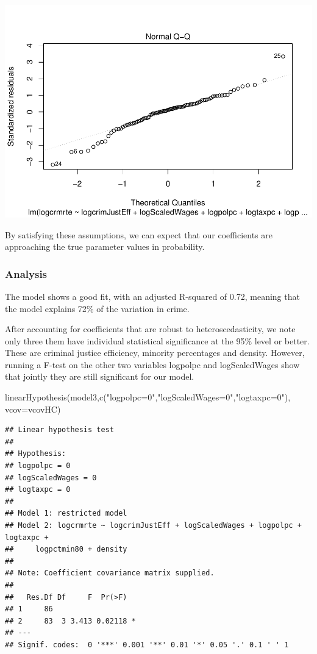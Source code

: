 \documentclass[]{article}
\newenvironment{Shaded}{}{}
\newcommand{\DataTypeTok}[1]{#1}
\newcommand{\KeywordTok}[1]{\textcolor[rgb]{0.00,0.00,1.00}{#1}}
\newcommand{\NormalTok}[1]{#1}
\newcommand{\StringTok}[1]{\textcolor[rgb]{0.00,0.50,0.50}{#1}}
\begin{document}
\includegraphics{Bagnard_Gaustad_Hartman_Leung_Lab_3_files/figure-latex/unnamed-chunk-88-1.pdf}

By satisfying these assumptions, we can expect that our coefficients are
approaching the true parameter values in probability.

\hypertarget{analysis}{%
\subsubsection{Analysis}\label{analysis}}

The model shows a good fit, with an adjusted R-squared of 0.72, meaning
that the model explains 72\% of the variation in crime.

After accounting for coefficients that are robust to heteroscedasticity,
we note only three them have individual statistical significance at the
95\% level or better. These are criminal justice efficiency, minority
percentages and density. However, running a F-test on the other two
variables logpolpc and logScaledWages show that jointly they are still
significant for our model.

\begin{Shaded}
\begin{Highlighting}[]
\KeywordTok{linearHypothesis}\NormalTok{(model3,}\KeywordTok{c}\NormalTok{(}\StringTok{"logpolpc=0"}\NormalTok{,}\StringTok{"logScaledWages=0"}\NormalTok{,}\StringTok{"logtaxpc=0"}\NormalTok{), }\DataTypeTok{vcov=}\NormalTok{vcovHC)}
\end{Highlighting}
\end{Shaded}

\begin{verbatim}
## Linear hypothesis test
## 
## Hypothesis:
## logpolpc = 0
## logScaledWages = 0
## logtaxpc = 0
## 
## Model 1: restricted model
## Model 2: logcrmrte ~ logcrimJustEff + logScaledWages + logpolpc + logtaxpc + 
##     logpctmin80 + density
## 
## Note: Coefficient covariance matrix supplied.
## 
##   Res.Df Df     F  Pr(>F)  
## 1     86                   
## 2     83  3 3.413 0.02118 *
## ---
## Signif. codes:  0 '***' 0.001 '**' 0.01 '*' 0.05 '.' 0.1 ' ' 1
\end{verbatim}
\end{document}
